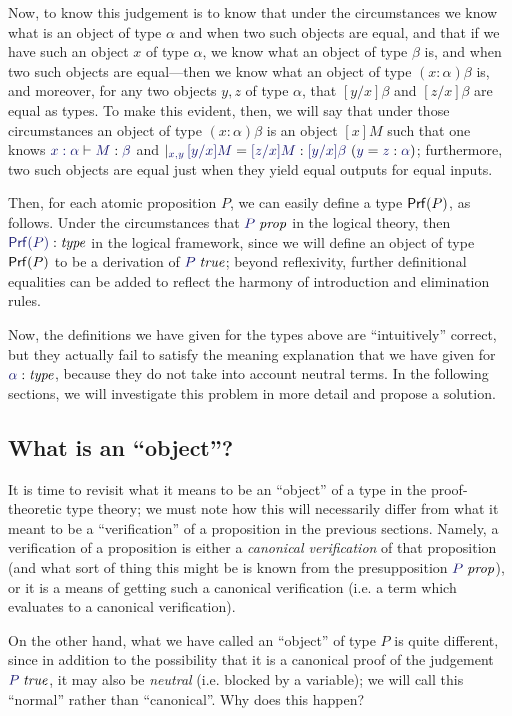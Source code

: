 Now, to know this judgement is to know that under the circumstances we
know what is an object of type $\alpha$ and when two such objects are
equal, and that if we have such an object $x$ of type $\alpha$, we
know what an object of type $\beta$ is, and when two such objects are
equal---then we know what an object of type $(x:\alpha)\beta$ is, and
moreover, for any two objects $y,z$ of type $\alpha$, that
$[y/x]\beta$ and $[z/x]\beta$ are equal as types. To make this
evident, then, we will say that under those circumstances an object of
type $(x:\alpha)\beta$ is an object $[x]M$ such that one knows
$\lfsequent{x:\alpha}{\ofty{M}{\beta}}$ and $\genj{x,y}{\hyp{\eofty{[y/x]M}{[z/x]M}{[y/x]\beta}}{\eofty{y}{z}{\alpha}}}$;
furthermore, two such objects are equal just when they yield equal
outputs for equal inputs.

Then, for each atomic proposition $P$, we can easily
define a type $\mathsf{Prf}(P)$, as follows. Under the circumstances that
$\isprop{P}$ in the logical theory, then $\type{\prf{P}}$ in the
logical framework, since we will define an object of type $\mathsf{Prf}(P)$ to
be a derivation of $\istrue{P}$; beyond reflexivity,
further definitional equalities can be added to reflect the harmony of
introduction and elimination rules.

Now, the definitions we have given for the types above are
``intuitively'' correct, but they actually fail to satisfy the meaning
explanation that we have given for $\type\alpha$, because they do not
take into account neutral terms. In the following sections, we will
investigate this problem in more detail and propose a solution.

\subsection{What is an ``object''?}
It is time to revisit what it means to be an ``object'' of a type in the
proof-theoretic type theory; we must note how this will necessarily differ from
what it meant to be a ``verification'' of a proposition in the previous
sections. Namely, a verification of a proposition is either a \emph{canonical
verification} of that proposition (and what sort of thing this might be is
known from the presupposition $\isprop{P}$), or it is a means of getting such
a canonical verification (i.e. a term which evaluates to a canonical
verification).

On the other hand, what we have called an ``object'' of type $P$ is quite
different, since in addition to the possibility that it is a canonical proof of
the judgement $\istrue{P}$, it may also be \emph{neutral} (i.e. blocked by a
variable); we will call this ``normal'' rather than ``canonical''. Why does
this happen?

